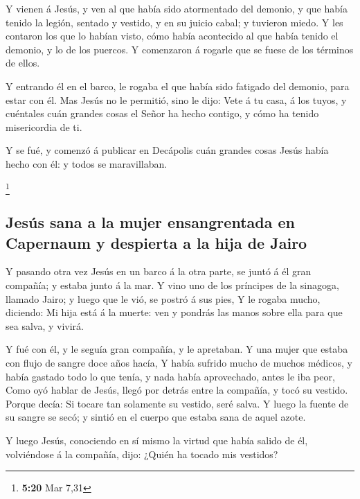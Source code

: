  Y vienen á Jesús, y ven al que había sido atormentado
del demonio, y que había tenido la legión, sentado y vestido, y en su
juicio cabal; y tuvieron miedo.  Y les contaron los que
lo habían visto, cómo había acontecido al que había tenido el demonio, y
lo de los puercos.  Y comenzaron á rogarle que se fuese
de los términos de ellos.

 Y entrando él en el barco, le rogaba el que había sido
fatigado del demonio, para estar con él.  Mas Jesús no le
permitió, sino le dijo: Vete á tu casa, á los tuyos, y cuéntales cuán
grandes cosas el Señor ha hecho contigo, y cómo ha tenido misericordia
de ti.

 Y se fué, y comenzó á publicar en Decápolis cuán grandes
cosas Jesús había hecho con él: y todos se maravillaban.

\footnote{\textbf{5:20} Mar 7,31}

\hypertarget{jesuxfas-sana-a-la-mujer-ensangrentada-en-capernaum-y-despierta-a-la-hija-de-jairo}{%
\subsection{Jesús sana a la mujer ensangrentada en Capernaum y despierta
a la hija de
Jairo}\label{jesuxfas-sana-a-la-mujer-ensangrentada-en-capernaum-y-despierta-a-la-hija-de-jairo}}

 Y pasando otra vez Jesús en un barco á la otra parte, se
juntó á él gran compañía; y estaba junto á la mar.  Y
vino uno de los príncipes de la sinagoga, llamado Jairo; y luego que le
vió, se postró á sus pies,  Y le rogaba mucho, diciendo:
Mi hija está á la muerte: ven y pondrás las manos sobre ella para que
sea salva, y vivirá.

 Y fué con él, y le seguía gran compañía, y le apretaban.
 Y una mujer que estaba con flujo de sangre doce años
hacía,  Y había sufrido mucho de muchos médicos, y había
gastado todo lo que tenía, y nada había aprovechado, antes le iba peor,
 Como oyó hablar de Jesús, llegó por detrás entre la
compañía, y tocó su vestido.  Porque decía: Si tocare tan
solamente su vestido, seré salva.  Y luego la fuente de
su sangre se secó; y sintió en el cuerpo que estaba sana de aquel azote.

 Y luego Jesús, conociendo en sí mismo la virtud que
había salido de él, volviéndose á la compañía, dijo: ¿Quién ha tocado
mis vestidos?

